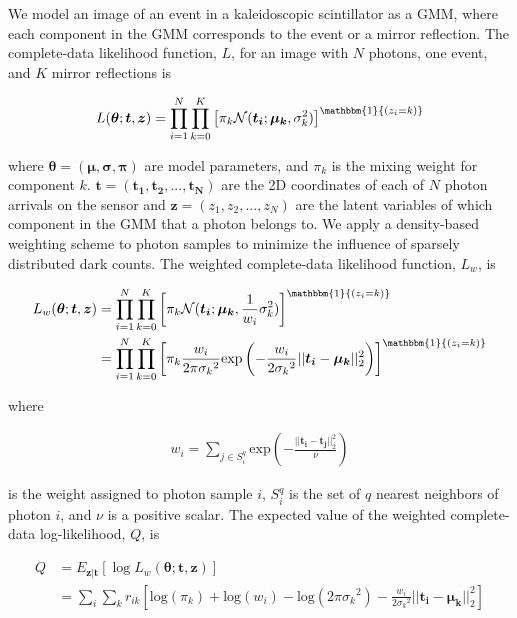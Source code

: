We model an image of an event in a kaleidoscopic scintillator as a GMM, where each 
component in the GMM corresponds to the event or a mirror reflection.
The complete-data likelihood function, $L$, for an image with $N$ photons, 
one event, and $K$ mirror reflections is
\begin{linenomath}
\begin{equation}
L(\bm{\theta};\bm{t},\bm{z})=\prod_{i=1}^N \prod_{k=0}^K \left[ \pi_k \mathcal{N}(\bm{t_i};\bm{\mu_k},\sigma_k^2) \right]^{\mathbbm{1}{(z_i=k)}}
\end{equation}
\end{linenomath}
where $\bm{\theta}=(\bm{\mu},\bm{\sigma},\bm{\pi})$ are model parameters, 
and $\pi_k$ is the mixing weight for component $k$.
$\bm{t}=(\bm{t_1}, \bm{t_2}, ..., \bm{t_N})$ are the 2D coordinates of each of 
$N$ photon arrivals on the sensor and $\bm{z}=(z_1, z_2, ..., z_N)$ are the latent 
variables of which component in the GMM that a photon belongs to.
We apply a density-based weighting scheme to photon samples to minimize the 
influence of sparsely distributed dark counts.
The weighted complete-data likelihood function, $L_w$, is
\begin{linenomath}
\begin{align}
L_w(\bm{\theta};\bm{t},\bm{z}) &= \prod_{i=1}^N \prod_{k=0}^K \left[ \pi_k \mathcal{N}(\bm{t_i};\bm{\mu_k},\frac{1}{w_i}\sigma_k^2) \right]^{\mathbbm{1}{(z_i=k)}} \\
&= \prod_{i=1}^N \prod_{k=0}^K \left[ \pi_k \frac{w_i}{2\pi{\sigma_k}^2} \text{exp}\left( -\frac{w_i}{2{\sigma_k}^2} ||\bm{t_i}-\bm{\mu_k}||_2^2 \right) \right]^{\mathbbm{1}{(z_i=k)}}
\end{align}
\end{linenomath}
where
\begin{linenomath}
\begin{align} \label{eqn:weights}
w_i = \sum_{j \in S_i^q} \text{exp} \left( -\frac{||\bm{t_i}-\bm{t_j}||_2^2}{\nu} \right)
\end{align}
\end{linenomath}
is the weight assigned to photon sample $i$, $S_i^q$ is the set of $q$ 
nearest neighbors of photon $i$, and $\nu$ is a positive scalar.
The expected value of the weighted complete-data log-likelihood, $Q$, is
\begin{linenomath}
\begin{equation} \label{eqn:Q_eqn}
\begin{aligned}
Q & = E_{\bm{z}|\bm{t}}\left[\log L_w(\bm{\theta};\bm{t},\bm{z})\right] \\ & = \sum_i \sum_k r_{ik} \left[ \text{log}(\pi_k) + \text{log}(w_i) - \text{log}(2\pi{\sigma_k}^2) - \frac{w_i}{2{\sigma_k}^2}||\bm{t_i}-\bm{\mu_k}||_2^2 \right]
\end{aligned}
\end{equation}
\end{linenomath}
